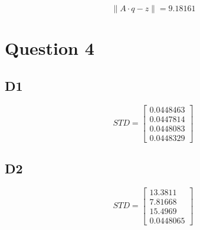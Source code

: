 \begin{equation}
\left\| A\cdot q-z \right\| = 9.18161
\label{eq:} 
\end{equation}





\section*{Question 4}
\subsection*{D1}
\begin{equation}
STD=\begin{bmatrix} 0.0448463 \\ 0.0447814 \\ 0.0448083 \\ 0.0448329  \end{bmatrix}
\label{eq:} 
\end{equation}


\subsection*{D2}
\begin{equation}
STD=\begin{bmatrix} 13.3811 \\ 7.81668 \\ 15.4969 \\ 0.0448065  \end{bmatrix}
\label{eq:} 
\end{equation}


